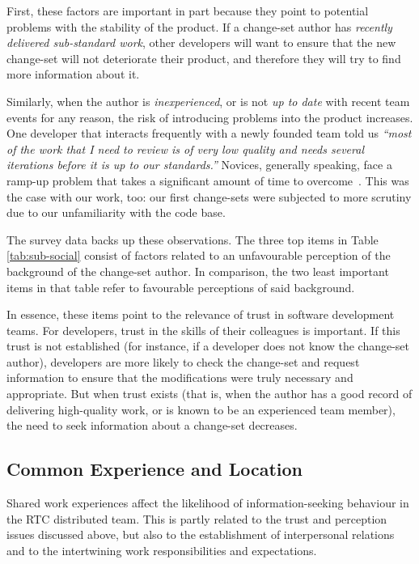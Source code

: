 First, these factors are important in part because they point to potential problems with the stability of the product. If a change-set author has \emph{recently delivered sub-standard work}, other developers will want to ensure that the new change-set will not deteriorate their product, and therefore they will try to find more information about it.

Similarly, when the author is \emph{inexperienced}, or is not \emph{up to date} with recent team events for any reason, the risk of introducing problems into the product increases. One developer that interacts frequently with a newly founded team told us \emph{``most of the work that I need to review is of very low quality and needs several iterations before it is up to our standards.''} Novices, generally speaking, face a ramp-up problem that takes a significant amount of time to overcome~\cite{begel:sigcse:2008}. This was the case with our work, too: our first change-sets were subjected to more scrutiny due to our unfamiliarity with the code base.

The survey data backs up these observations. The three top items in Table \ref{tab:sub-social} consist of factors related to an unfavourable perception of the background of the change-set author. In comparison, the two least important items in that table refer to favourable perceptions of said background.

In essence, these items point to the relevance of trust in software development teams. For developers, trust in the skills of their colleagues is important. If this trust is not established (for instance, if a developer does not know the change-set author), developers are more likely to check the change-set and request information to ensure that the modifications were truly necessary and appropriate. But when trust exists (that is, when the author has a good record of delivering high-quality work, or is known to be an experienced team member), the need to seek information about a change-set decreases. 


\subsection{Common Experience and Location}
Shared work experiences affect the likelihood of information-seeking behaviour in the RTC distributed team. This is partly related to the trust and perception issues discussed above, but also to the establishment of interpersonal relations and to the intertwining work responsibilities and expectations.

